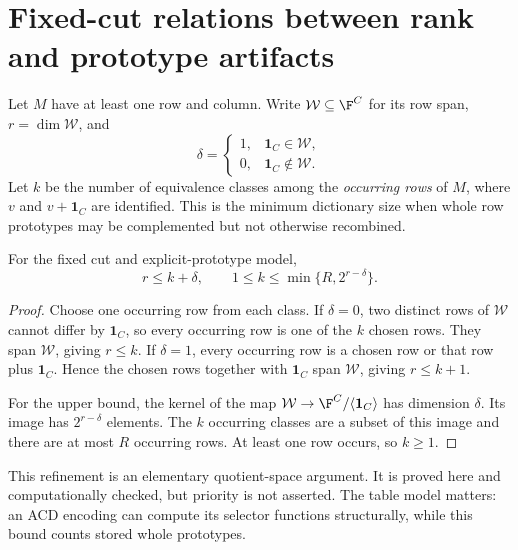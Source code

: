 \section{Fixed-cut relations between rank and prototype artifacts}
\label{sec:quotient}
Let $M$ have at least one row and column. Write $\mathcal W\subseteq\F^C$ for its row span, $r=\dim\mathcal W$, and
\[
 \delta=\begin{cases}1,&\boldsymbol1_C\in\mathcal W,\\0,&\boldsymbol1_C\notin\mathcal W.\end{cases}
\]
Let $k$ be the number of equivalence classes among the \emph{occurring rows} of $M$, where $v$ and $v+\boldsymbol1_C$ are identified. This is the minimum dictionary size when whole row prototypes may be complemented but not otherwise recombined.

\begin{theorem}
\label{thm:quotient}
For the fixed cut and explicit-prototype model,
\begin{equation}
 r\le k+\delta,\qquad
 1\le k\le\min\{R,2^{r-\delta}\}.
 \label{eq:quotient}
\end{equation}
\end{theorem}
\begin{proof}
Choose one occurring row from each class. If $\delta=0$, two distinct rows of $\mathcal W$ cannot differ by $\boldsymbol1_C$, so every occurring row is one of the $k$ chosen rows. They span $\mathcal W$, giving $r\le k$. If $\delta=1$, every occurring row is a chosen row or that row plus $\boldsymbol1_C$. Hence the chosen rows together with $\boldsymbol1_C$ span $\mathcal W$, giving $r\le k+1$.

For the upper bound, the kernel of the map $\mathcal W\to\F^C/\langle\boldsymbol1_C\rangle$ has dimension $\delta$. Its image has $2^{r-\delta}$ elements. The $k$ occurring classes are a subset of this image and there are at most $R$ occurring rows. At least one row occurs, so $k\ge1$.
\end{proof}

This refinement is an elementary quotient-space argument. It is proved here and computationally checked, but priority is not asserted. The table model matters: an ACD encoding can compute its selector functions structurally, while this bound counts stored whole prototypes.

